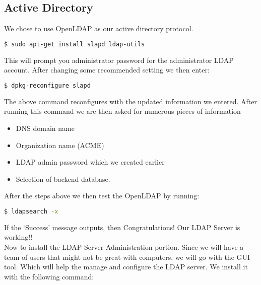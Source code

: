 
\subsection{Active Directory}
We chose to use OpenLDAP as our active directory protocol.

\begin{lstlisting}[language=bash]
  $ sudo apt-get install slapd ldap-utils	
\end{lstlisting}

\vspace{.5em}

\noindent This will prompt you administrator password for the administrator LDAP 
account.
After changing some recommended setting we then enter:

\begin{lstlisting}[language=bash]
  $ dpkg-reconfigure slapd
\end{lstlisting}

\vspace{.5em}

\noindent The above command reconfigures with the updated information we entered. After 
running this command we are then asked for numerous pieces of information

\begin{itemize}
	\item DNS domain name
	\item Organization name (ACME)
	\item LDAP admin password which we created earlier
	\item Selection of backend database. 
\end{itemize}

\vspace{.5em}

\noindent After the steps above we then test the OpenLDAP by running:

\begin{lstlisting}[language=bash]
  $ ldapsearch -x
\end{lstlisting}

\vspace{.5em}

\noindent If the ‘Success’ message outputs, then Congratulations! Our LDAP 
Server is working!!\\ 

\noindent Now to install the LDAP Server Administration portion. Since we will 
have a team of users that might not be great with computers, we will go with
the GUI tool. Which will help the manage and configure the LDAP server.
We install it with the following command:

